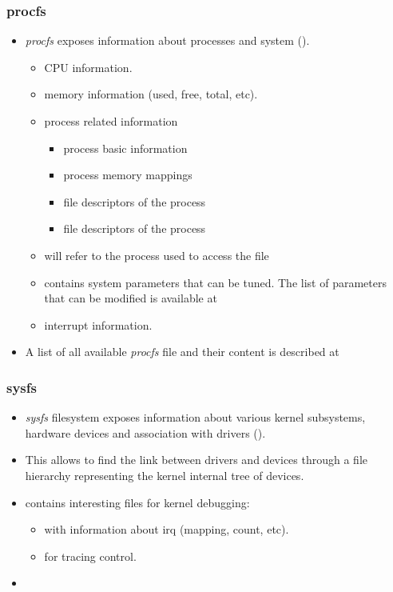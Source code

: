 \begin{frame}
  \frametitle{procfs}
  \begin{itemize}
    \item {\em procfs} exposes information about processes and system
          ().
    \begin{itemize}
      \item {} CPU information.
      \item {} memory information (used, free, total, etc).
      \item {} process related information
      \begin{itemize}
        \item{} process basic information
        \item {} process memory mappings
        \item {} file descriptors of the process
        \item {} file descriptors of the process
      \end{itemize}
      \item {} will refer to the process used to access the file
      \item {} contains system parameters that can be tuned. The
            list of parameters that can be modified is available at
      \item {} interrupt information.
    \end{itemize}
    \item A list of all available {\em procfs} file and their content is
          described at 
  \end{itemize}
\end{frame}

\begin{frame}
  \frametitle{sysfs}
  \begin{itemize}
    \item {\em sysfs} filesystem exposes information about various kernel
          subsystems, hardware devices and association with drivers
          ().
    \item This allows to find the link between drivers and devices through a
          file hierarchy representing the kernel internal tree of devices.
    \item {} contains interesting files for kernel debugging:
    \begin{itemize}
      \item {} with information about irq (mapping, count, etc).
      \item {} for tracing control.
    \end{itemize}
    \item {}
  \end{itemize}
\end{frame}

